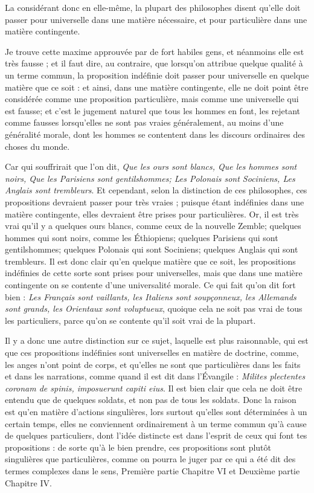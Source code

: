La considérant donc en elle-même, la plupart des philosophes disent qu'elle doit passer pour universelle dans une matière nécessaire, et pour particulière dans une matière contingente.

Je trouve cette maxime approuvée par de fort habiles gens, et néanmoins elle est très fausse ; et il faut dire, au contraire, que lorsqu'on attribue quelque qualité à un terme commun, la proposition indéfinie doit passer pour universelle en quelque matière que ce soit : et ainsi, dans une matière contingente, elle ne doit point être considérée comme une proposition particulière, mais comme une universelle qui est fausse; et c'est le jugement naturel que tous les hommes en font, les rejetant comme fausses lorsqu'elles ne sont pas vraies généralement, au moins d'une généralité morale, dont les hommes se contentent dans les discours ordinaires des choses du monde.

Car qui souffrirait que l'on dit, \emph{Que les ours sont blancs, Que les hommes sont noirs, Que les Parisiens sont gentilshommes; Les Polonais sont Sociniens, Les Anglais sont trembleurs}. Et cependant, selon la distinction de ces philosophes, ces propositions devraient passer pour très vraies ; puisque étant indéfinies dans une matière contingente, elles devraient être prises pour particulières. Or, il est très vrai qu'il y a quelques ours blancs, comme ceux de la nouvelle Zemble; quelques hommes qui sont noirs, comme les Éthiopiens; quelques Parisiens qui sont gentilshommes; quelques Polonais qui sont Sociniens; quelques Anglais qui sont trembleurs. Il est donc clair qu'en quelque matière que ce soit, les propositions indéfinies de cette sorte sont prises pour universelles, mais que dans une matière contingente on se contente d'une universalité morale. Ce qui fait qu'on dit fort bien : \emph{Les Français sont vaillants, les Italiens sont soupçonneux, les Allemands sont grands, les Orientaux sont voluptueux}, quoique cela ne soit pas vrai de tous les particuliers, parce qu'on se contente qu'il soit vrai de la plupart.

Il y a donc une autre distinction sur ce sujet, laquelle est plus raisonnable, qui est que ces propositions indéfinies sont universelles en matière de doctrine, comme, les anges n'ont point de corps, et qu'elles ne sont que particulières dans les faits et dans les narrations, comme quand il est dit dans l'Évangile : \emph{Milites plectentes coronam de spinis, imposuerunt capiti eius}. Il est bien clair que cela ne doit être entendu que de quelques soldats, et non pas de tous les soldats. Donc la raison est qu'en matière d'actions singulières, lors surtout qu'elles sont déterminées à un certain temps, elles ne conviennent ordinairement à un terme commun qu'à cause de quelques particuliers, dont l'idée distincte est dans l'esprit de ceux qui font tes propositions : de sorte qu'à le bien prendre, ces propositions sont plutôt singulières que particulières, comme on pourra le juger par ce qui a été dit des termes complexes dans le sens, Première partie Chapitre VI et Deuxième partie Chapitre IV.

